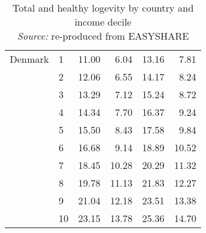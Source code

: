 \begin{table}
\begin{tabular}{llrrrr}
Denmark & 1  &   11.00 &   6.04 &  13.16 &   7.81 \\
            & 2  &   12.06 &   6.55 &  14.17 &   8.24 \\
            & 3  &   13.29 &   7.12 &  15.24 &   8.72 \\
            & 4  &   14.34 &   7.70 &  16.37 &   9.24 \\
            & 5  &   15.50 &   8.43 &  17.58 &   9.84 \\
            & 6  &   16.68 &   9.14 &  18.89 &  10.52 \\
            & 7  &   18.45 &  10.28 &  20.29 &  11.32 \\
            & 8  &   19.78 &  11.13 &  21.83 &  12.27 \\
            & 9  &   21.04 &  12.18 &  23.51 &  13.38 \\
            & 10 &   23.15 &  13.78 &  25.36 &  14.70 \\
\bottomrule
\end{tabular}
\captionsetup{justification=centering}
\caption{Total and healthy logevity by country and income decile \\ 
\textit{Source:} re-produced from EASYSHARE }
\end{table}









